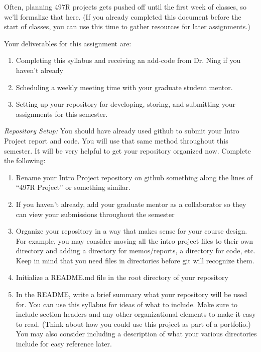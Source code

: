 \documentclass[12pt]{article}
\begin{document}
\bigskip

Often, planning 497R projects gets pushed off until the first week of classes, so we'll formalize that here. 
(If you already completed this document before the start of classes, you can use this time to gather resources for later assignments.)

Your deliverables for this assignment are:
\begin{enumerate}
	\item Completing this syllabus and receiving an add-code from Dr. Ning if you haven't already
	\item Scheduling a weekly meeting time with your graduate student mentor.
	\item Setting up your repository for developing, storing, and submitting your assignments for this semester. 
\end{enumerate}

\textit{Repository Setup:} You should have already used github to submit your Intro Project report and code. You will use that same method throughout this semester.
It will be very helpful to get your repository organized now.
Complete the following:

\begin{enumerate}
	\item Rename your Intro Project repository on github something along the lines of ``497R Project'' or something similar.
	\item If you haven't already, add your graduate mentor as a collaborator so they can view your submissions throughout the semester
	\item Organize your repository in a way that makes sense for your course design. For example, you may consider moving all the intro project files to their own directory and adding a directory for memos/reports, a directory for code, etc.  Keep in mind that you need files in directories before git will recognize them.
	\item Initialize a README.md file in the root directory of your repository
	\item In the README, write a brief summary what your repository will be used for.  You can use this syllabus for ideas of what to include.  Make sure to include section headers and any other organizational elements to make it easy to read. (Think about how you could use this project as part of a portfolio.) You may also consider including a description of what your various directories include for easy reference later.
\end{enumerate}
\end{document}
